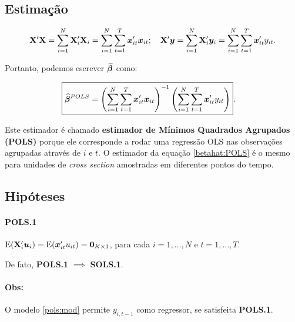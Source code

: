 \documentclass[11pt, oneside, a4paper, article]{article}
\numberwithin{equation}{section}
\begin{document}
\subsection{Estimação}

\begin{align*}
	\mathbf{X}' \mathbf{X} 
	=
	\sum_{i=1}^{N} \mathbf{X}_{i}' \mathbf{X}_{i}
	=
	\sum_{i=1}^{N} \sum_{t=1}^{T} \boldsymbol{x}_{it}' \boldsymbol{x}_{it};
	\quad
	\mathbf{X}' \boldsymbol{y} 
	=
	\sum_{i=1}^{N} \mathbf{X}_{i}' \boldsymbol{y}_{i}
	=
	\sum_{i=1}^{N} \sum_{t=1}^{T} \boldsymbol{x}_{it}' y_{it}.
\end{align*}

Portanto, podemos escrever $\widehat{\boldsymbol{\beta}}$ como:

\vspace{-1 em}
\begin{align} \label{betahat:POLS}
	\Aboxed{
		\betahatbold^{POLS} =
		\left( \sum_{i=1}^{N} \sum_{t=1}^{T} \xvec_{it}' \xvec_{it} \right)^{-1}
		\left( \sum_{i=1}^{N} \sum_{t=1}^{T} \xvec_{it}' y_{it} \right)
	}.
\end{align}

Este estimador é chamado \textbf{estimador de Mínimos Quadrados Agrupados (POLS)} porque ele corresponde a rodar uma regressão OLS nas observações agrupadas através de $i$ e $t$. 
O estimador da equação \eqref{betahat:POLS} é o mesmo para unidades de \textit{cross section} amostradas em diferentes pontos do tempo.

\subsection{Hipóteses}

\paragraph{POLS.1} $\text{E}(\mathbf{X}_{i}' \boldsymbol{u}_{i}) = \text{E}(\boldsymbol{x}_{it}'u_{it}) = \boldsymbol{0}_{K \times 1}$, para cada
$i=1, \dots, N$ e $t=1, \dots, T$.

\noindent
De fato, \textbf{POLS.1} $\implies$ \textbf{SOLS.1}.

\paragraph{Obs:}
O modelo \eqref{pols:mod} permite $y_{i,t-1}$ como regressor, se satisfeita \textbf{POLS.1}.
\end{document}

